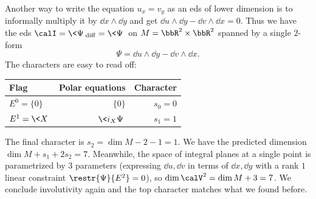 \begin{example}\label{ex ux=vy 2}
    Another way to write the equation $u_x=v_y$ as an \gls{eds} of lower dimension is to informally multiply it by $\dd x\wedge\dd y$ and get $\dd u\wedge\dd y-\dd v\wedge\dd x=0$. Thus we have the \gls{eds} $\calI=\<\Psi\>_{\mathrm{diff}}=\<\Psi\>$ on $M=\bbR^2\times\bbR^2$ spanned by a single $2$-form 
    \[\Psi=\dd u\wedge\dd y-\dd v\wedge\dd x.\]
    The characters are easy to read off: 
    \begin{center}
        \begin{tabular}{l r r} 
         Flag & Polar equations & Character \\ [0.5ex] 
         \hline
         $E^0=\{0\}$ & $\{0\}$ & $s_0=0$ \\ 
         $E^1=\<X\>$ & $\<i_X\Psi\>$ & $s_1=1$ \\
         \hline
        \end{tabular}
    \end{center}
    The final character is $s_2=\dim M-2-1=1$. We have the predicted dimension $\dim M+s_1+2s_2=7$. Meanwhile, the space of integral planes at a single point is parametrized by $3$ parameters (expressing $\dd u,\dd v$ in terms of $\dd x,\dd y$ with a rank $1$ linear constraint $\restr{\Psi}{E^2}=0$), so $\dim\calV^2=\dim M+3=7$. We conclude involutivity again and the top character matches what we found before.
\end{example}


